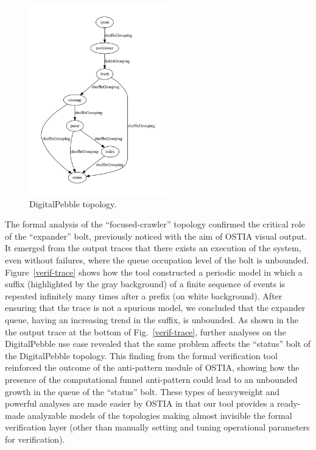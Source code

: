\begin{figure}
\begin{center}
\includegraphics[width=6cm]{images/output/crawl}
		\caption{DigitalPebble topology.}
		\label{dp}
		\end{center}
\end{figure}
The formal analysis of the ``focused-crawler'' topology confirmed the critical role of the ``expander'' bolt, previously noticed with the aim of OSTIA visual output. It emerged from the output traces that there exists an execution of the system, even without failures, where the queue occupation level of the bolt is unbounded. Figure~\ref{verif-trace} shows how the tool constructed a periodic model in which a suffix (highlighted by the gray background) of a finite sequence of events is repeated infinitely many times after a prefix (on white background). After ensuring that the trace is not a spurious model, we concluded that the expander queue, having an increasing trend in the suffix, is unbounded. 
As shown in the the output trace at the bottom of Fig.~\ref{verif-trace}, further analyses on the DigitalPebble use case revealed that the same problem affects the ``status'' bolt of the DigitalPebble topology. This finding from the formal verification tool reinforced the outcome of the anti-pattern module of OSTIA, showing how the presence of the computational funnel anti-pattern could lead to an unbounded growth in the queue of the ``status'' bolt.
These types of heavyweight and powerful analyses are made easier by OSTIA in that our tool provides a ready-made analyzable models of the topologies making almost invisible the formal verification layer (other than manually setting and tuning operational parameters for verification). %
%

